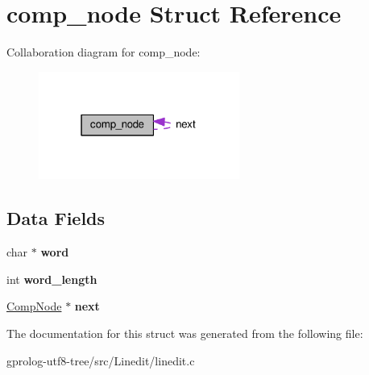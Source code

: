 \hypertarget{structcomp__node}{}\section{comp\+\_\+node Struct Reference}
\label{structcomp__node}


Collaboration diagram for comp\+\_\+node\+:\nopagebreak
\begin{figure}[H]
\begin{center}
\leavevmode
\includegraphics[width=187pt]{structcomp__node__coll__graph}
\end{center}
\end{figure}
\subsection*{Data Fields}
\begin{DoxyCompactItemize}
\item 
char $\ast$ {\bfseries word}\hypertarget{structcomp__node_a087b822f301956dd57ff59bf5d9ce9a4}{}\label{structcomp__node_a087b822f301956dd57ff59bf5d9ce9a4}

\item 
int {\bfseries word\+\_\+length}\hypertarget{structcomp__node_ab0e205b1c196f493851ae425e904c59b}{}\label{structcomp__node_ab0e205b1c196f493851ae425e904c59b}

\item 
\hyperlink{structcomp__node}{Comp\+Node} $\ast$ {\bfseries next}\hypertarget{structcomp__node_aa91fd30c56bcfb19162045c7856d66c8}{}\label{structcomp__node_aa91fd30c56bcfb19162045c7856d66c8}

\end{DoxyCompactItemize}


The documentation for this struct was generated from the following file\+:\begin{DoxyCompactItemize}
\item 
gprolog-\/utf8-\/tree/src/\+Linedit/linedit.\+c\end{DoxyCompactItemize}
